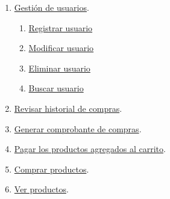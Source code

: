 \begin{enumerate}
\begin{enumerate}
				\end{enumerate}
			\item \hyperlink{Gesti\'on de usuarios}{Gesti\'on de usuarios}.
				\begin{enumerate}
					\item \hyperlink{Registrar usuario}{Registrar usuario}
					\item \hyperlink{Modificar usuario}{Modificar usuario}
					\item \hyperlink{Eliminar usuario}{Eliminar usuario}
					\item \hyperlink{Buscar usuario}{Buscar usuario}
				\end{enumerate}
			\item \hyperlink{Revisar historial de compras}{Revisar historial de compras}.
			\item \hyperlink{Generar comprobante de compras}{Generar comprobante de compras}.
			\item \hyperlink{Pagar los productos agregados al carrito}{Pagar los productos agregados al carrito}.
			\item \hyperlink{Comprar productos}{Comprar productos}.
			\item \hyperlink{Ver productos}{Ver productos}.
\end{enumerate}